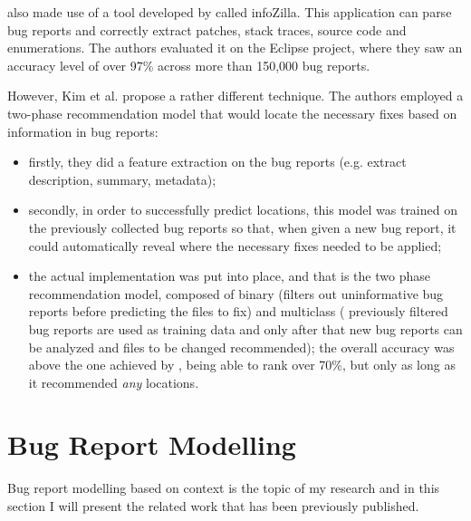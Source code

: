 \documentclass[11pt,english,twocolumn]{article}
\begin{document}
\cite{bettenburg2012using} also made use of a tool developed by 
\cite{bettenburg2008extracting} called infoZilla. This application can
parse bug reports and correctly extract patches, stack traces, source code and
enumerations. The authors evaluated it on the Eclipse project, where they saw
an accuracy level of over 97\% across more than 150,000 bug reports.

However, Kim et al. \cite{kim2013should} propose a rather different technique.
The authors employed a two-phase recommendation model that would locate the 
necessary fixes based on information in bug reports:
  \begin{itemize}
    \item firstly, they did a feature extraction on the bug reports (e.g. 
    extract description, summary, metadata);
    \item secondly, in order to successfully predict
    locations, this model was trained on the previously collected bug reports so that,
    when given a new bug report, it could automatically reveal where the necessary fixes
    needed to be applied;
    \item the actual implementation was put into place, and that
    is the two phase recommendation model, composed of binary (filters out 
    uninformative bug reports before predicting the files to fix) and multiclass (
    previously filtered bug reports are used as training data and only after that
    new bug reports can be analyzed and files to be changed recommended); the 
    overall accuracy was above the one achieved by \cite{bettenburg2012using}, 
    being able to rank over 70\%, but only as long as it recommended \emph{any} 
    locations.
  \end{itemize}

\section{Bug Report Modelling}
\label{sec:bug-report}

Bug report modelling based on context is the topic of my research and in this
section I will present the related work that has been previously published.
\end{document}
